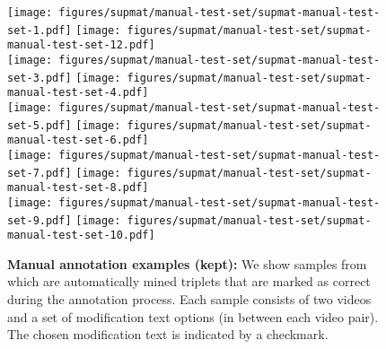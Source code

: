 \begin{figure}
    \centering
    {\texttt{[image: figures/supmat/manual-test-set/supmat-manual-test-set-1.pdf]}}\hfill 
    {\texttt{[image: figures/supmat/manual-test-set/supmat-manual-test-set-12.pdf]}}\\\vspace{0.2cm}
    {\texttt{[image: figures/supmat/manual-test-set/supmat-manual-test-set-3.pdf]}}\hfill
    {\texttt{[image: figures/supmat/manual-test-set/supmat-manual-test-set-4.pdf]}}\\\vspace{0.2cm}
    {\texttt{[image: figures/supmat/manual-test-set/supmat-manual-test-set-5.pdf]}}\hfill
    {\texttt{[image: figures/supmat/manual-test-set/supmat-manual-test-set-6.pdf]}}\\\vspace{0.2cm}
    {\texttt{[image: figures/supmat/manual-test-set/supmat-manual-test-set-7.pdf]}}\hfill
    {\texttt{[image: figures/supmat/manual-test-set/supmat-manual-test-set-8.pdf]}}\\\vspace{0.2cm}
    {\texttt{[image: figures/supmat/manual-test-set/supmat-manual-test-set-9.pdf]}}\hfill
    {\texttt{[image: figures/supmat/manual-test-set/supmat-manual-test-set-10.pdf]}}
    \caption{\textbf{Manual annotation examples (kept):} We show samples from \ourDSm which are automatically mined triplets that are marked as correct during the annotation process. Each sample consists of two videos and a set of modification text options (in between each video pair). 
    The chosen modification text is indicated by a checkmark.}
    \label{app:fig:manual-test-correct}
\end{figure}

